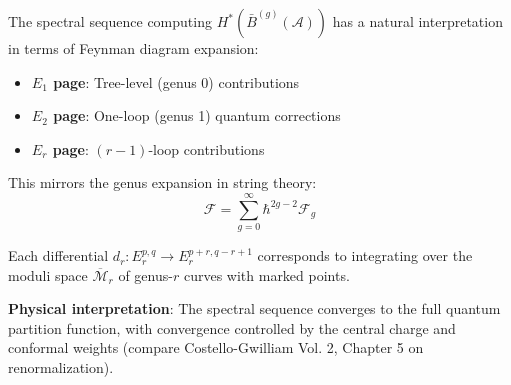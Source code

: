 \begin{remark}\label{rem:genus-spectral-connection}
The spectral sequence computing $H^*(\bar{B}^{(g)}(\mathcal{A}))$ has a natural interpretation in terms of Feynman diagram expansion:

\begin{itemize}
\item \textbf{$E_1$ page}: Tree-level (genus 0) contributions
\item \textbf{$E_2$ page}: One-loop (genus 1) quantum corrections
\item \textbf{$E_r$ page}: $(r-1)$-loop contributions
\end{itemize}

This mirrors the genus expansion in string theory:
$$\mathcal{F} = \sum_{g=0}^{\infty} \hbar^{2g-2} \mathcal{F}_g$$

Each differential $d_r: E_r^{p,q} \to E_r^{p+r, q-r+1}$ corresponds to integrating over the moduli space $\overline{\mathcal{M}}_r$ of genus-$r$ curves with marked points.

\textbf{Physical interpretation}: The spectral sequence converges to the full quantum partition function, with convergence controlled by the central charge and conformal weights (compare Costello-Gwilliam Vol. 2, Chapter 5 on renormalization).
\end{remark}

